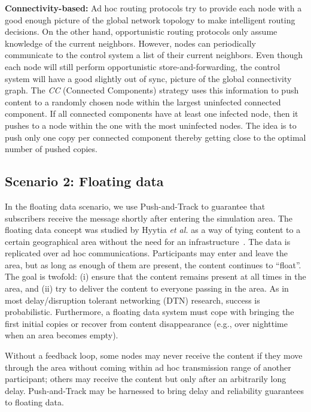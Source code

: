\documentclass[preprint]{elsarticle}
\begin{document}
\smallskip\noindent\textbf{Connectivity-based:} Ad hoc routing protocols try to provide each node with a good enough picture of the global network topology to make intelligent routing decisions. On the other hand, opportunistic routing protocols only assume knowledge of the current neighbors. However, nodes can periodically communicate to the control system a list of their current neighbors. Even though each node will still perform opportunistic store-and-forwarding, the control system will have a good slightly out of sync, picture of the global connectivity graph. The \textit{CC} (Connected Components) strategy uses this information to push content to a randomly chosen node within the largest uninfected connected component. If all connected components have at least one infected node, then it pushes to a node within the one with the most uninfected nodes. The idea is to push only one copy per connected component thereby getting close to the optimal number of pushed copies.

\subsection{Scenario 2: Floating data}
\label{subsec:floating_scenario}

In the floating data scenario, we use Push-and-Track to guarantee that subscribers receive the message shortly after entering the simulation area. The floating data concept was studied by Hyytia \textit{et al.} as a way of tying content to a certain geographical area without the need for an infrastructure~\cite{Hyytia2011}. The data is replicated over ad hoc communications. Participants may enter and leave the area, but as long as enough of them are present, the content continues to ``float''. The goal is twofold: (i) ensure that the content remains present at all times in the area, and (ii) try to deliver the content to everyone passing in the area. As in most delay/disruption tolerant networking (DTN) research, success is probabilistic. Furthermore, a floating data system must cope with bringing the first initial copies or recover from content disappearance (e.g., over nighttime when an area becomes empty). 

Without a feedback loop, some nodes may never receive the content if they move through the area without coming within ad hoc transmission range of another participant; others may receive the content but only after an arbitrarily long delay. Push-and-Track may be harnessed to bring delay and reliability guarantees to floating data.
\end{document}
